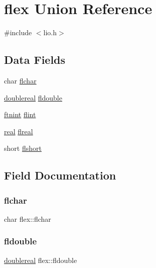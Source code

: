 \hypertarget{unionflex}{}\section{flex Union Reference}
\label{unionflex}


{\ttfamily \#include $<$lio.\+h$>$}

\subsection*{Data Fields}
\begin{DoxyCompactItemize}
\item 
char \hyperlink{unionflex_a9ecbf00ed733a4b2c5448745dcf06aa8}{flchar}
\item 
\hyperlink{dependencies_2third-party_2clapack_23_82_81_2_f2_c_l_i_b_s_2libf2c_2f2c_8h_a1e69afaa4e6077b67397e6c36454b97a}{doublereal} \hyperlink{unionflex_a58636df05cdd1d2d522614ed28792bbc}{fldouble}
\item 
\hyperlink{dependencies_2third-party_2clapack_23_82_81_2_f2_c_l_i_b_s_2libf2c_2f2c_8h_a9d70cdb573fb2bf020e1f6dba85fb1cc}{ftnint} \hyperlink{unionflex_ad06dfacd03549adce1a9d063a2067019}{flint}
\item 
\hyperlink{dependencies_2third-party_2clapack_23_82_81_2_f2_c_l_i_b_s_2libf2c_2f2c_8h_a031f8951175b43076c2084a6c2173410}{real} \hyperlink{unionflex_a68fa92e241f7d010a94a4289c7339a16}{flreal}
\item 
short \hyperlink{unionflex_ae01aaf5ced8d300a0e2fe2fee733e009}{flshort}
\end{DoxyCompactItemize}


\subsection{Field Documentation}
\mbox{\label{unionflex_a9ecbf00ed733a4b2c5448745dcf06aa8}} 
\subsubsection{\texorpdfstring{flchar}{flchar}}
{\footnotesize\ttfamily char flex\+::flchar}

\mbox{\label{unionflex_a58636df05cdd1d2d522614ed28792bbc}} 
\subsubsection{\texorpdfstring{fldouble}{fldouble}}
{\footnotesize\ttfamily \hyperlink{dependencies_2third-party_2clapack_23_82_81_2_f2_c_l_i_b_s_2libf2c_2f2c_8h_a1e69afaa4e6077b67397e6c36454b97a}{doublereal} flex\+::fldouble}

